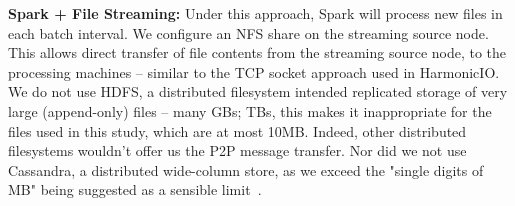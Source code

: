 \documentclass[letterpaper,conference]{IEEEtran}
\begin{document}
\textbf{Spark + File Streaming:} Under this approach, Spark will process new files in each batch interval. %
We configure an NFS share on the streaming source node. This allows direct transfer of file contents from the streaming source node, to the processing machines -- similar to the TCP socket approach used in HarmonicIO. 
We do not use HDFS, a distributed filesystem intended replicated storage of very large (append-only) files -- many GBs; TBs, this makes it inappropriate for the files used in this study, which are at most 10MB. 
Indeed, other distributed filesystems wouldn't offer us the P2P message transfer. Nor did we not use Cassandra, a distributed wide-column store, as we exceed the "single digits of MB" being suggested as a sensible limit~\cite{CassandraLimitationsCASSANDRA2Apache}. 
\end{document}
